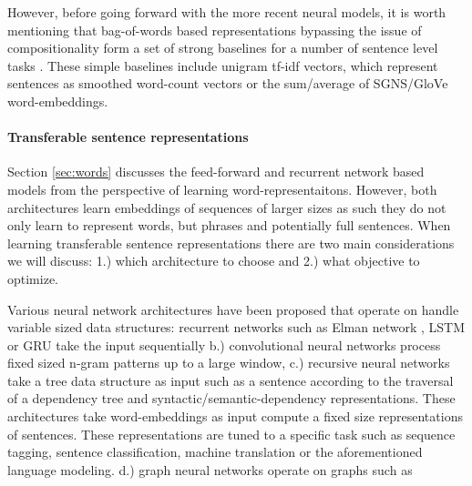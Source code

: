 However, before going forward with the more recent neural models,
it is worth mentioning that bag-of-words
based representations bypassing the issue of compositionality form a set of strong baselines
for a number of sentence level tasks \cite{hill2016learning}.
These simple baselines include unigram tf-idf vectors, which represent sentences as
smoothed word-count vectors or the sum/average of SGNS/GloVe word-embeddings.

\paragraph{Transferable sentence representations}
\label{sec:sentence}

Section \ref{sec:words} discusses the feed-forward \cite{bengio2003neural}
and recurrent network based models \cite{mikolov2010recurrent} from the perspective
of learning word-representaitons. However, both architectures learn embeddings
of sequences of larger sizes as such they do not only learn to represent
words, but phrases and potentially full sentences. When learning transferable
sentence representations there are two main considerations we will discuss:
1.) which architecture to choose and 2.) what objective to optimize.

Various neural network architectures have been proposed that operate on
handle variable sized data structures: recurrent networks such as
Elman network \cite{elman1991distributed},
LSTM \cite{hochreiter1997long} or GRU \cite{cho2014properties} take the input sequentially
b.) convolutional neural networks
\cite{kalchbrenner2014convolutional,zhang2015character,conneau2016very,chen2013learning}
process fixed sized n-gram patterns up to a large window,
c.) recursive neural networks \cite{goller1996learning.socher2011parsing,tai2015improved}
take a tree data structure as input such as a sentence according to the traversal of a dependency tree and
syntactic/semantic-dependency representations.
These architectures take word-embeddings as input compute a fixed size representations of
sentences. These representations are tuned to a specific task such as sequence tagging,
sentence classification, machine translation or the aforementioned language modeling.
d.) graph neural networks operate on graphs \cite{marcheggiani2017encoding} such as

